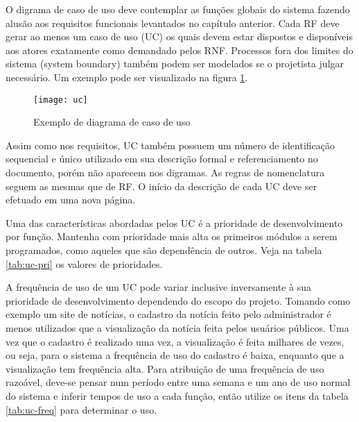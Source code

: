\documentclass[12pt,openright,a4paper,brazil]{abntex2}
\begin{document}
O digrama de caso de uso deve contemplar as funções globais do sistema fazendo alusão aos requisitos funcionais levantados no capítulo anterior. Cada RF deve gerar ao menos um caso de uso (UC) os quais devem estar dispostos e disponíveis aos atores exatamente como demandado pelos RNF. Processos fora dos limites do sistema (system boundary) também podem ser modelados se o projetista julgar necessário. Um exemplo pode ser visualizado na figura \ref{fig:uc}.

\begin{figure}
	\centering
	\texttt{[image: uc]}
	\caption{Exemplo de diagrama de caso de uso}
	\label{fig:uc}
\end{figure}


Assim como nos requisitos, UC também possuem um número de identificação sequencial e único utilizado em sua descrição formal e referenciamento no documento, porém não aparecem nos digramas. As regras de nomenclatura seguem as mesmas que de RF. O início da descrição de cada UC deve ser efetuado em uma nova página.

Uma das características abordadas pelos UC é a prioridade de desenvolvimento por função. Mantenha com prioridade mais alta os primeiros módulos a serem programados, como aqueles que são dependência de outros. Veja na tabela \ref{tab:uc-pri} os valores de prioridades.

A frequência de uso de um UC pode variar inclusive inversamente à sua prioridade de desenvolvimento dependendo do escopo do projeto. Tomando como exemplo um site de notícias, o cadastro da notícia feito pelo administrador é menos utilizados que a visualização da notícia feita pelos usuários públicos. Uma vez que o cadastro é realizado uma vez, a visualização é feita milhares de vezes, ou seja, para o sistema a frequência de uso do cadastro é baixa, enquanto que a visualização tem frequência alta. Para atribuição de uma frequência de uso razoável, deve-se pensar num período entre uma semana e um ano de uso normal do sistema e inferir tempos de uso a cada função, então utilize os itens da tabela \ref{tab:uc-freq} para determinar o uso.
\end{document}
